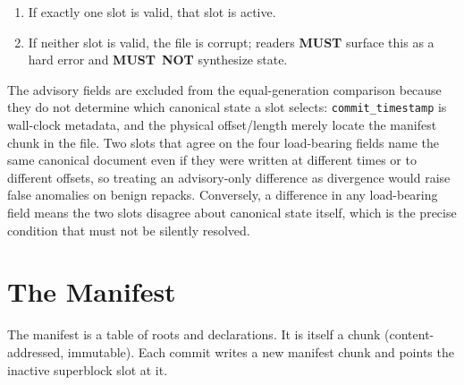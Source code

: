 \documentclass[11pt,letterpaper]{report}
\newcounter{requirement}[chapter]
\newcommand{\MUST}{\textbf{MUST}}
\newcommand{\MUSTNOT}{\textbf{MUST}\nobreak\ \textbf{NOT}}
\begin{document}
\begin{requirement}
\begin{enumerate}
\begin{itemize}
          select equivalent canonical state; the reader \MUST{}
          deterministically choose slot~A and open normally.
        \item If any load-bearing field differs, the reader \MUST{}
          report a format-layer \texttt{IntegrityAnomaly} of kind
          \texttt{DivergentSameGeneration} and open the bundle
          read-only. Two genuinely different committed states cannot
          share a generation under a conforming writer (the
          atomic-write protocol increments the generation on every
          commit), so the divergence is a structural failure, not a
          state the reader may silently resolve by picking one.
      \end{itemize}
    \item If exactly one slot is valid, that slot is active.
    \item If neither slot is valid, the file is corrupt; readers
      \MUST{} surface this as a hard error and \MUSTNOT{}
      synthesize state.
  \end{enumerate}
\end{requirement}

\begin{rationale}
  The advisory fields are excluded from the equal-generation
  comparison because they do not determine which canonical state a
  slot selects: \texttt{commit\_timestamp} is wall-clock metadata,
  and the physical offset/length merely locate the manifest chunk in
  the file. Two slots that agree on the four load-bearing fields name
  the same canonical document even if they were written at different
  times or to different offsets, so treating an advisory-only
  difference as divergence would raise false anomalies on benign
  repacks. Conversely, a difference in any load-bearing field means
  the two slots disagree about canonical state itself, which is the
  precise condition that must not be silently resolved.
\end{rationale}

\section{The Manifest}
\label{sec:format:manifest}

The manifest is a table of roots and declarations. It is itself a
chunk (content-addressed, immutable). Each commit writes a new
manifest chunk and points the inactive superblock slot at it.
\end{document}
